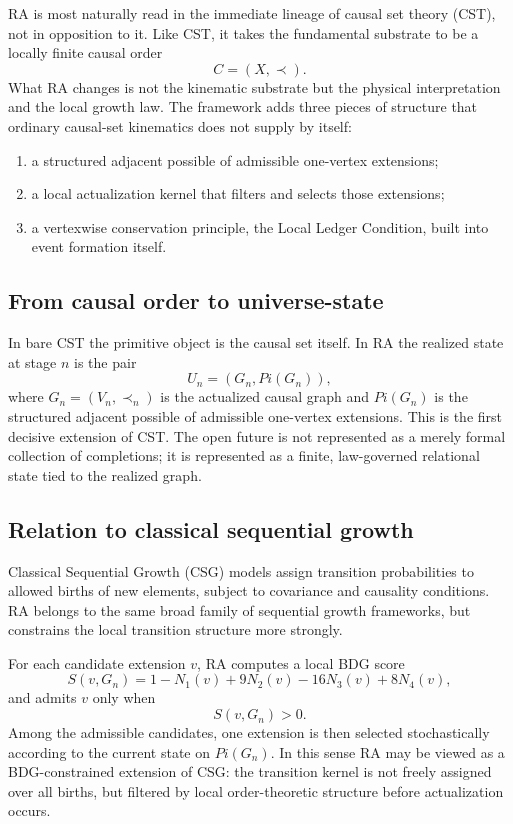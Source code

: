 \documentclass[11pt]{article}
\def\Pi{Pi}%
\begin{document}
RA is most naturally read in the immediate lineage of causal set theory (CST), not in opposition to it.
Like CST, it takes the fundamental substrate to be a locally finite causal order
\[
C=(X,\prec).
\]
What RA changes is not the kinematic substrate but the physical interpretation and the local growth law.
The framework adds three pieces of structure that ordinary causal-set kinematics does not supply by itself:
\begin{enumerate}[label=(\roman*)]
\item a structured adjacent possible of admissible one-vertex extensions;
\item a local actualization kernel that filters and selects those extensions;
\item a vertexwise conservation principle, the Local Ledger Condition, built into event formation itself.
\end{enumerate}

\subsection{From causal order to universe-state}

In bare CST the primitive object is the causal set itself. In RA the realized state at stage $n$ is the pair
\[
U_n=(G_n,\Pi(G_n)),
\]
where $G_n=(V_n,\prec_n)$ is the actualized causal graph and $\Pi(G_n)$ is the structured adjacent possible of admissible one-vertex extensions. This is the first decisive extension of CST. The open future is not represented as a merely formal collection of completions; it is represented as a finite, law-governed relational state tied to the realized graph.

\subsection{Relation to classical sequential growth}

Classical Sequential Growth (CSG) models assign transition probabilities to allowed births of new elements, subject to covariance and causality conditions. RA belongs to the same broad family of sequential growth frameworks, but constrains the local transition structure more strongly.

For each candidate extension $v$, RA computes a local BDG score
\[
S(v,G_n)=1-N_1(v)+9N_2(v)-16N_3(v)+8N_4(v),
\]
and admits $v$ only when
\[
S(v,G_n)>0.
\]
Among the admissible candidates, one extension is then selected stochastically according to the current state on $\Pi(G_n)$. In this sense RA may be viewed as a BDG-constrained extension of CSG: the transition kernel is not freely assigned over all births, but filtered by local order-theoretic structure before actualization occurs.
\end{document}
